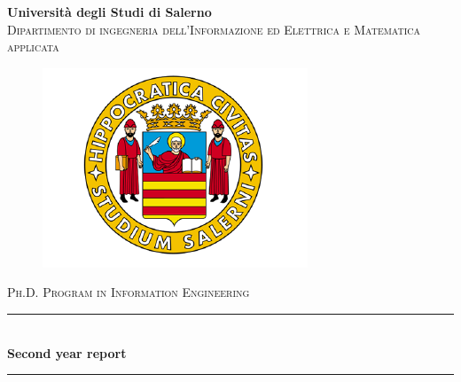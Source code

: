 \begin{titlepage}

    \newcommand{\HRule}{\rule{\linewidth}{0.5mm}} %

    \center %


    \textbf{\huge Università degli Studi di Salerno}\\[0.6cm] %
    \textsc{\Large Dipartimento di ingegneria dell'Informazione ed Elettrica e Matematica applicata}\\[0.2cm]

    \begin{figure}[H]
        \centering
        \includegraphics[width = 0.6\linewidth]{Figures/logo.png}
    \end{figure}
    \textsc{\Large Ph.D. Program in Information Engineering}\\[0.4cm] %


    \HRule \\[0.8cm]
    { \huge \bfseries Second year report}\\[0.3cm] %
    \HRule \\[1.5cm]



\end{titlepage}

